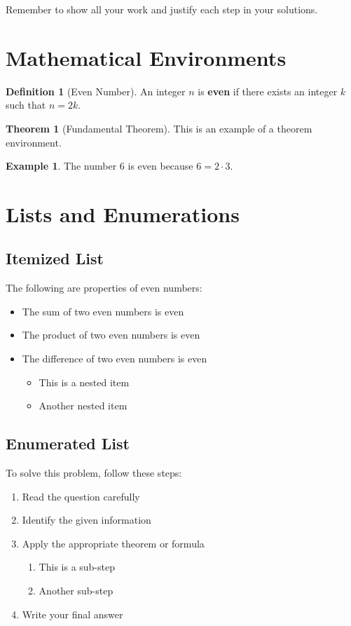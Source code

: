\documentclass[tikz,12pt,a4paper]{article}
\theoremstyle{definition}
\newtheorem{definition}{Definition}[section]
\newtheorem{theorem}{Theorem}[section]
\newtheorem{example}{Example}[section]
\begin{document}
\begin{importantbox}
Remember to show all your work and justify each step in your solutions.
\end{importantbox}

\section{Mathematical Environments}

\begin{definition}[Even Number]
An integer $n$ is \textbf{even} if there exists an integer $k$ such that $n = 2k$.
\end{definition}

\begin{theorem}[Fundamental Theorem]
This is an example of a theorem environment.
\end{theorem}

\begin{example}
The number 6 is even because $6 = 2 \cdot 3$.
\end{example}

\section{Lists and Enumerations}

\subsection{Itemized List}

The following are properties of even numbers:
\begin{itemize}
  \item The sum of two even numbers is even
  \item The product of two even numbers is even
  \item The difference of two even numbers is even
  \begin{itemize}
    \item This is a nested item
    \item Another nested item
  \end{itemize}
\end{itemize}

\subsection{Enumerated List}

To solve this problem, follow these steps:
\begin{enumerate}
  \item Read the question carefully
  \item Identify the given information
  \item Apply the appropriate theorem or formula
  \begin{enumerate}
    \item This is a sub-step
    \item Another sub-step
  \end{enumerate}
  \item Write your final answer
\end{enumerate}
\end{document}
